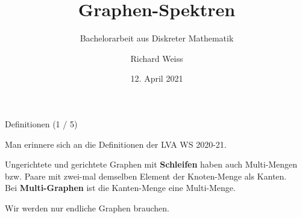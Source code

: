 \documentclass[aspectratio=169]{beamer}
\title[Graphen-Spektren]{Graphen-Spektren}
\subtitle{Bachelorarbeit aus Diskreter Mathematik}
\author[R. Weiss]{Richard Weiss}
\institute[TU Wien]{TU Wien, Vienna, Austria}
\date{12. April 2021}
\begin{document}
\begin{frame}
    \titlepage
\end{frame}            


\begin{frame}{Definitionen (1 / 5)}

    Man erinnere sich an die Definitionen der LVA  WS 2020-21.

    \begin{definition*}
        Ungerichtete und gerichtete Graphen mit \textbf{Schleifen} haben auch Multi-Mengen bzw. Paare mit zwei-mal demselben Element der Knoten-Menge als Kanten. \\
        Bei \textbf{Multi-Graphen} ist die Kanten-Menge eine Multi-Menge.
    \end{definition*}

    Wir werden nur endliche Graphen brauchen.

\end{frame}
\end{document}
